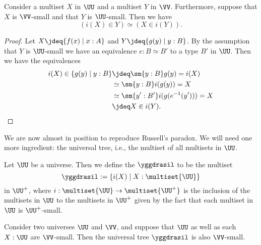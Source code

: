 \begin{prp}\label{prp:elementhood-small-multisets}
  Consider a multiset $X$ in $\UU$ and a multiset $Y$ in $\VV$. Furthermore, suppose that $X$ is $\VV$-small and that $Y$ is $\UU$-small. Then we have
  \begin{equation*}
    (i(X)\in Y)\simeq (X\in i(Y)).
  \end{equation*}
\end{prp}

\begin{proof}
  Let $X\jdeq\{f(x)\mid x:A\}$ and $Y\jdeq\{g(y)\mid y:B\}$. By the assumption that $Y$ is $\UU$-small we have an equivalence $e:B\simeq B'$ to a type $B'$ in $\UU$. Then we have the equivalences
  \begin{align*}
    i(X) \in \{g(y)\mid y:B\} & \jdeq \sm{y:B}g(y)=i(X) \\
                              & \simeq \sm{y:B}i(g(y))=X \\
                              & \simeq \sm{y':B'}i(g(e^{-1}(y')))=X \\
                              & \jdeq X\in i(Y).\qedhere
  \end{align*}
\end{proof}

We are now almost in position to reproduce Russell's paradox. We will need one more ingredient: the universal tree, i.e., the multiset of all multisets in $\UU$. 

\begin{defn}
  Let $\UU$ be a universe. Then we define the  $\yggdrasil$ to be the multiset
  \begin{equation*}
    \yggdrasil:=\{i(X) \mid X:\multiset{\UU}\}
  \end{equation*}
  in $\UU^{+}$, where $i:\multiset{\UU}\to\multiset{\UU^+}$ is the inclusion of the multisets in $\UU$ to the multisets in $\UU^+$ given by the fact that each multiset in $\UU$ is $\UU^+$-small.
\end{defn}

\begin{prp}\label{prp:is-small-universal-tree}
  Consider two universes $\UU$ and $\VV$, and suppose that $\UU$ as well as each $X:\UU$ are $\VV$-small. Then the universal tree $\yggdrasil$ is also $\VV$-small.
\end{prp}

